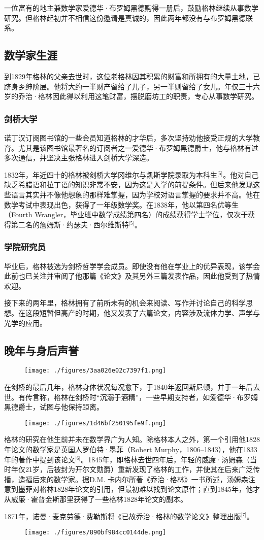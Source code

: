 一位富有的地主兼数学家爱德华·布罗姆黑德购得一册后，鼓励格林继续从事数学研究。但格林起初并不相信这份邀请是真诚的，因此两年都没有与布罗姆黑德联系。
\subsection{数学家生涯}
到1829年格林的父亲去世时，这位老格林因其积累的财富和所拥有的大量土地，已跻身乡绅阶层。他将大约一半财产留给了儿子，另一半则留给了女儿。年仅三十六岁的乔治·格林因此得以利用这笔财富，摆脱磨坊工的职责，专心从事数学研究。
\subsubsection{剑桥大学}
诺丁汉订阅图书馆的一些会员知道格林的才华后，多次坚持劝他接受正规的大学教育。尤其是该图书馆最著名的订阅者之一爱德华·布罗姆黑德爵士，他与格林有过多次通信，并坚决主张格林进入剑桥大学深造。

1832年，年近四十的格林被剑桥大学冈维尔与凯斯学院录取为本科生\(^\text{[5]}\)。他对自己缺乏希腊语和拉丁语的知识非常不安，因为这是入学的前提条件。但后来他发现这些语言其实并不像他想象的那样难掌握，因为学校对语言掌握的要求并不高。他在数学考试中表现出色，获得了一年级数学奖。在1838年，他以第四名优等生（Fourth Wrangler，毕业班中数学成绩第四名）的成绩获得学士学位，仅次于获得第二名的詹姆斯·约瑟夫·西尔维斯特\(^\text{[5]}\)。
\subsubsection{学院研究员}
毕业后，格林被选为剑桥哲学学会成员。即使没有他在学业上的优异表现，该学会此前也已关注并审阅了他那篇《论文》及其另外三篇发表作品，因此他受到了热情欢迎。

接下来的两年里，格林拥有了前所未有的机会来阅读、写作并讨论自己的科学思想。在这段短暂但高产的时期，他又发表了六篇论文，内容涉及流体力学、声学与光学的应用。
\subsection{晚年与身后声誉}
\begin{figure}[ht]
\centering
\texttt{[image: ./figures/3aa026e02c7397f1.png]}
\caption{} \label{fig_QZgl_3}
\end{figure}
在剑桥的最后几年，格林身体状况每况愈下，于1840年返回斯尼顿，并于一年后去世。有传言称，格林在剑桥时“沉溺于酒精”，一些早期支持者，如爱德华·布罗姆黑德爵士，试图与他保持距离。
\begin{figure}[ht]
\centering
\texttt{[image: ./figures/1d46bf250195fe9f.png]}
\caption{} \label{fig_QZgl_4}
\end{figure}
格林的研究在他生前并未在数学界广为人知。除格林本人之外，第一个引用他1828年论文的数学家是英国人罗伯特·墨菲（Robert Murphy，1806–1843），他在1833年的著作中提到该论文\(^\text{[6]}\)。1845年，即格林去世四年后，年轻的威廉·汤姆森（当时年仅21岁，后被封为开尔文勋爵）重新发现了格林的工作，并使其在后来广泛传播，造福后来的数学家。据D.M. 卡内尔所著《乔治·格林》一书所述，汤姆森注意到墨菲对格林1828年论文的引用，但最初难以找到论文原件；直到1845年，他才从威廉·霍普金斯那里获得了一些格林1828年论文的副本。

1871年，诺曼·麦克劳德·费勒斯将《已故乔治·格林的数学论文》整理出版\(^\text{[7]}\)。
\begin{figure}[ht]
\centering
\texttt{[image: ./figures/890bf984cc0144de.png]}
\caption{} \label{fig_QZgl_5}
\end{figure}

